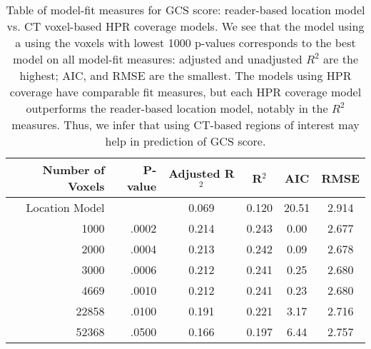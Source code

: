 \begin{table}[H]
\centering
\begin{tabular}{rr|cccc}
  \hline
{\bf Number of Voxels} & {\bf P-value} & {\bf Adjusted R$^2$} & {\bf R$^2$} & {\bf AIC} & {\bf RMSE} \\ 
  \hline
Location Model &  & 0.069 & 0.120 & 20.51 & 2.914 \\ 
  1000 & .0002 & 0.214 & 0.243 & 0.00 & 2.677 \\ 
  2000 & .0004 & 0.213 & 0.242 & 0.09 & 2.678 \\ 
  3000 & .0006 & 0.212 & 0.241 & 0.25 & 2.680 \\ 
  4669 & .0010 & 0.212 & 0.241 & 0.23 & 2.680 \\ 
  22858 & .0100 & 0.191 & 0.221 & 3.17 & 2.716 \\ 
  52368 & .0500 & 0.166 & 0.197 & 6.44 & 2.757 \\ 
   \hline
\end{tabular}
\caption{Table of model-fit measures for GCS score: reader-based location model vs. CT voxel-based HPR coverage models. We see that the model using a using the voxels with lowest 1000 p-values corresponds to the best model on all model-fit measures: adjusted and unadjusted $R^2$ are the highest; AIC, and RMSE are the smallest.  The models using HPR coverage have comparable fit measures, but each HPR coverage model outperforms the reader-based location model, notably in the $R^2$ measures.  Thus, we infer that using CT-based regions of interest may help in prediction of GCS score.} 
\label{t:gcs}
\end{table}

